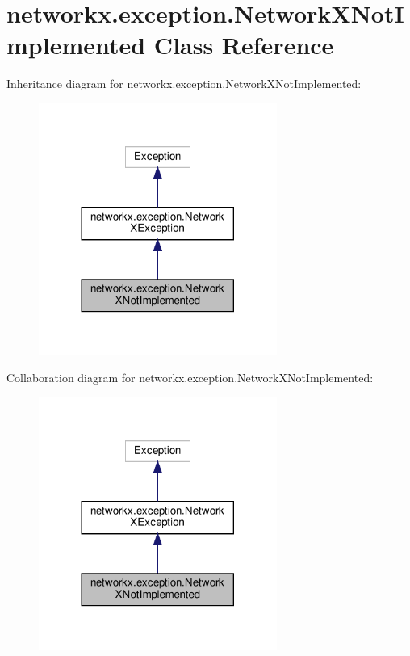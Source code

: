 \hypertarget{classnetworkx_1_1exception_1_1NetworkXNotImplemented}{}\section{networkx.\+exception.\+Network\+X\+Not\+Implemented Class Reference}
\label{classnetworkx_1_1exception_1_1NetworkXNotImplemented}


Inheritance diagram for networkx.\+exception.\+Network\+X\+Not\+Implemented\+:
\nopagebreak
\begin{figure}[H]
\begin{center}
\leavevmode
\includegraphics[width=221pt]{classnetworkx_1_1exception_1_1NetworkXNotImplemented__inherit__graph}
\end{center}
\end{figure}


Collaboration diagram for networkx.\+exception.\+Network\+X\+Not\+Implemented\+:
\nopagebreak
\begin{figure}[H]
\begin{center}
\leavevmode
\includegraphics[width=221pt]{classnetworkx_1_1exception_1_1NetworkXNotImplemented__coll__graph}
\end{center}
\end{figure}



